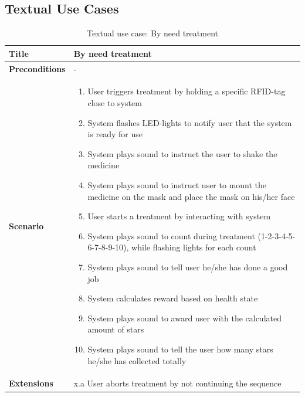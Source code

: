 \subsection{Textual Use Cases}

\begin{table}[H]
\begin{tabular}{|p{4.0cm} | p{9.0cm} |}
\hline
\textbf{Title} & By need treatment \\
\hline
\textbf{Preconditions} & - \\
\hline 
\textbf{Scenario} & 
	\begin{enumerate}
	  \item User triggers treatment by holding a specific RFID-tag close to system
	  \item System flashes LED-lights to notify user that the system is ready for use
	  \item System plays sound to instruct the user to shake the medicine
	  \item System plays sound to instruct user to mount the medicine on the mask and place the mask on his/her face
	  \item User starts a treatment by interacting with system
	  \item System plays sound to count during treatment (1-2-3-4-5-6-7-8-9-10), while flashing lights for each count
	  \item System plays sound to tell user he/she has done a good job
	  \item System calculates reward based on health state
	  \item System plays sound to award user with the calculated amount of stars
	  \item System plays sound to tell the user how many stars he/she has collected totally
	\end{enumerate}
\\
\hline
	\textbf{Extensions} & 
		x.a User aborts treatment by not continuing the sequence
\\
\hline
\end{tabular}
\caption{Textual use case: By need treatment}
\label{tab:textual-use-case}
\end{table}



